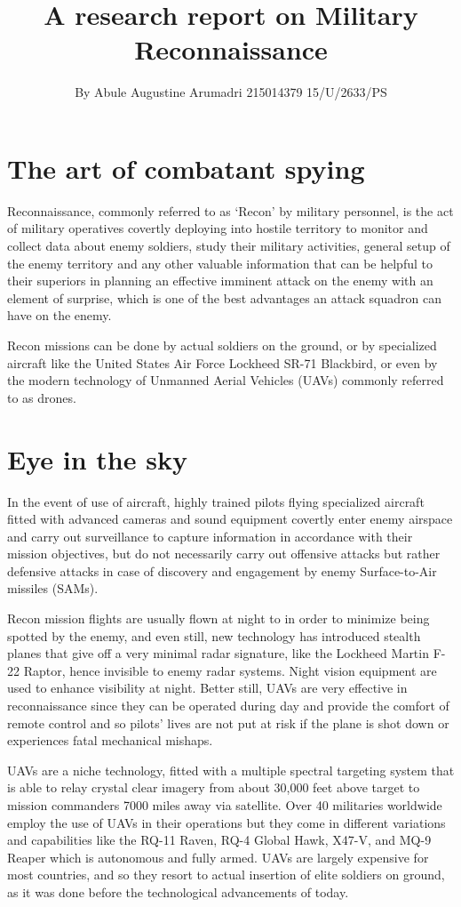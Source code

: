 \documentclass{article}
\title{A research report on Military Reconnaissance}
\author{By Abule Augustine Arumadri 215014379 15/U/2633/PS}
\date{}
\begin{document}
\maketitle
\tableofcontents
\section{The art of combatant spying}
Reconnaissance, commonly referred to as ‘Recon’ by military personnel, is the act of military operatives covertly deploying into hostile territory to monitor and collect 
data about enemy soldiers, study their military activities, general setup of the enemy territory and any other valuable information that can be helpful to their superiors
 in planning an effective imminent attack on the enemy with an element of surprise, which is one of the best advantages an attack squadron can have on the enemy.

 Recon missions can be done by actual soldiers on the ground, or by specialized aircraft like the United States Air Force Lockheed SR-71 Blackbird, or
 even by the modern technology of Unmanned Aerial Vehicles (UAVs) commonly referred to as drones.


\section{Eye in the sky}
In the event of use of aircraft, highly trained pilots flying specialized aircraft fitted with advanced cameras and sound equipment covertly enter enemy airspace 
and carry out surveillance to capture information in accordance with their mission objectives, but do not necessarily carry out offensive attacks but rather defensive
 attacks in case of discovery and engagement by enemy Surface-to-Air missiles (SAMs).

 Recon mission flights are usually flown at night to in order to minimize being spotted
 by the enemy, and even still, new technology has introduced stealth planes that give off a very minimal radar signature, like the Lockheed Martin F-22 Raptor, hence invisible 
to enemy radar systems. Night vision equipment are used to enhance visibility at night. Better still, UAVs are very effective in reconnaissance since they can be operated
 during day and provide the comfort of remote control and so pilots’ lives are not put at risk if the plane is shot down or experiences fatal mechanical mishaps. 

UAVs are a niche technology, fitted with a multiple spectral targeting system that is able to relay crystal clear imagery from about 30,000 feet above target to mission 
commanders 7000 miles away via satellite. Over 40 militaries worldwide employ the use of UAVs in their operations but they come in different variations and capabilities
 like the RQ-11 Raven, RQ-4 Global Hawk, X47-V, and MQ-9 Reaper which is autonomous and fully armed. UAVs are largely expensive for most countries, and so they resort 
to actual insertion of elite soldiers on ground, as it was done before the technological advancements of today.
\end{document}
